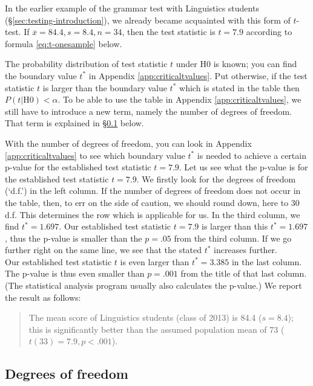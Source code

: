 \documentclass[
]{book}
\begin{document}
In the earlier example of the grammar test with Linguistics students
(§\ref{sec:testing-introduction}), we already became acquainted with
this form of \(t\)-test.
If \(\overline{x}=84.4, s=8.4, n=34\), then the test statistic
is \(t=7.9\) according to formula \eqref{eq:t-onesample} below.

The probability distribution of test statistic \(t\) under H0 is known;
you can find the boundary value \(t^*\) in
Appendix \ref{app:criticaltvalues}. Put otherwise, if the test statistic \(t\)
is larger than the boundary value \(t^*\) which is stated in the table then
\(P(t|\textrm{H0})<\alpha\). To be able to use the table in Appendix
\ref{app:criticaltvalues}, we still have to introduce a new term,
namely the number of degrees of freedom. That term is
explained in
§\ref{sec:ttest-freedomdegrees} below.

With the number of degrees of freedom, you can look in Appendix
\ref{app:criticaltvalues} to see which boundary value \(t^*\) is needed
to achieve a certain p-value for the established test statistic
\(t=7.9\). Let us see what the p-value is for the established
test statistic \(t=7.9\). We firstly look for the degrees of freedom (`d.f.') in the left column.
If the number of degrees of freedom does not occur in the table, then, to err
on the side of caution, we should round down, here to 30 d.f. This determines the row
which is applicable for us. In the third column, we find \(t^*=1.697\). Our
established test statistic \(t=7.9\) is larger than this \(t^*=1.697\), thus the p-value
is smaller than the \(p=.05\) from the third column. If we go further right on
the same line, we see that the stated \(t^*\) increases further.\\
Our established test statistic \(t\) is even larger than \(t^*=3.385\) in the last column.
The p-value is thus even smaller than \(p=.001\) from the title of that last
column. (The statistical analysis program usually also calculates the p-value.)
We report
the result as follows:

\begin{quote}
The mean score of Linguistics students (class of 2013) is
84.4 (\(s=8.4\)); this is significantly better than the assumed
population mean of 73 (\(t(33)=7.9, p<.001\)).
\end{quote}

\hypertarget{sec:ttest-freedomdegrees}{%
\subsection{Degrees of freedom}\label{sec:ttest-freedomdegrees}}
\end{document}
